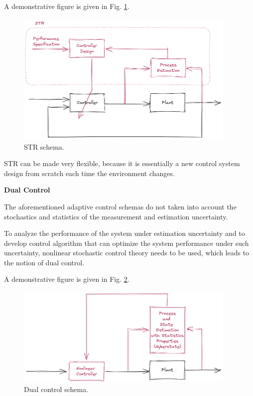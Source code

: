 A demonstrative figure is given in Fig. \ref{ch:acs:fig:str_schema}.

\begin{figure}
	\centering
	\includegraphics[width=300pt]{chapters/ch-adaptive-control-system/figures/str_schema.png}
	\caption{STR schema.} \label{ch:acs:fig:str_schema}
\end{figure}

STR can be made very flexible, because it is essentially a new control system design from scratch each time the environment changes.

\vspace{0.1in}
\noindent \textbf{Dual Control}
\vspace{0.1in}

The aforementioned adaptive control schemas do not taken into account the stochastics and statistics of the measurement and estimation uncertainty.

To analyze the performance of the system under estimation uncertainty and to develop control algorithm that can optimize the system performance under such uncertainty, nonlinear stochastic control theory needs to be used, which leads to the notion of dual control.

A demonstrative figure is given in Fig. \ref{ch:acs:fig:dual_schema}.

\begin{figure}
	\centering
	\includegraphics[width=300pt]{chapters/ch-adaptive-control-system/figures/dual_schema.png}
	\caption{Dual control schema.} \label{ch:acs:fig:dual_schema}
\end{figure}

